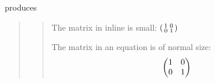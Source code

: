 \documentclass[letterpaper,compsoc,twoside]{IEEEtran}
\begin{document}
produces\begin{quotation}%
\begin{quote}


The matrix in inline is small:
$\mathchoice{\begin{pmatrix}1 & 0\\0 &
1\end{pmatrix}}{\left(\begin{smallmatrix}1 & 0\\0 &
1\end{smallmatrix}\right)}{\left(\begin{smallmatrix}1 & 0\\0 &
1\end{smallmatrix}\right)}{\left(\begin{smallmatrix}1 & 0\\0 &
1\end{smallmatrix}\right)}$

The matrix in an equation is
of normal size:\begin{equation*}
\mathchoice{\begin{pmatrix}1 & 0\\0 &
1\end{pmatrix}}{\left(\begin{smallmatrix}1 & 0\\0 &
1\end{smallmatrix}\right)}{\left(\begin{smallmatrix}1 & 0\\0 &
1\end{smallmatrix}\right)}{\left(\begin{smallmatrix}1 & 0\\0 &
1\end{smallmatrix}\right)}
\end{equation*}
\end{quote}
\end{quotation}
% 
\end{document}
